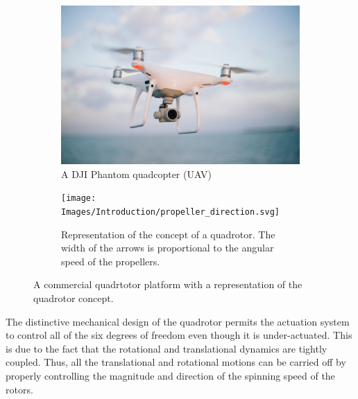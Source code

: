 \documentclass{thesisreport}
\begin{document}
\begin{figure}[h]
     \centering
     \begin{subfigure}[b]{0.45\textwidth}
         \centering
         \includegraphics[width=\textwidth]{Images/Introduction/drone}
         \caption[Caption for LOF]{A DJI Phantom quadcopter (UAV)\protect\footnotemark}
         \label{fig:drone}
     \end{subfigure}
     \hfill
     \begin{subfigure}[b]{0.45\textwidth}
         \centering
         \texttt{[image: Images/Introduction/propeller\_direction.svg]}
         \caption{Representation of the concept of a quadrotor. The width of the arrows is proportional to the angular speed of the propellers.\cite{Bouabdalla2007}}
         \label{fig:propeller_directions}
     \end{subfigure}
        \caption{A commercial quadrtotor platform with a representation of the quadrotor concept.}
        \label{fig:three graphs}
\end{figure}

\noindent The distinctive mechanical design of the quadrotor permits the actuation system to control all of the six degrees of freedom even though it is under-actuated. This is due to the fact that the rotational and translational dynamics are tightly coupled. Thus, all the translational and rotational motions can be carried off by properly controlling the magnitude and direction of the spinning speed of the rotors.   

\noindent {}


\pagebreak
\end{document}
